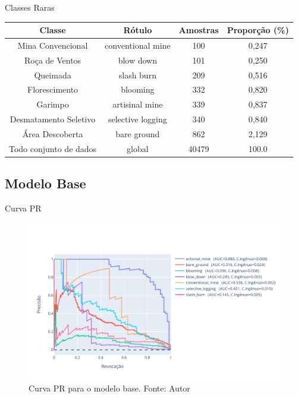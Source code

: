 \documentclass[8pt]{beamer}
\begin{document}
        
\begin{frame}{Classes Raras}
    \fontsize{7pt}{8pt}\selectfont
    \center
    \begin{tabular}{*{4}{c}}
        \hline
        Classe                  &            Rótulo &  Amostras      &  Proporção (\%) \\
        \hline
        Mina Convencional       & conventional mine &        100     &       0,247 \\
        Roça de Ventos          &         blow down &        101     &       0,250 \\
        Queimada                &        slash burn &        209     &       0,516 \\
        Florescimento           &          blooming &        332     &       0,820 \\
        Garimpo                 &    artisinal mine &        339     &       0,837 \\
        Desmatamento Seletivo   & selective logging &        340     &       0,840 \\
        Área Descoberta         &       bare ground &        862     &       2,129 \\
        Todo conjunto de dados  &            global &        40479   &       100.0 \\
        \hline
    \end{tabular}    
\end{frame}        
    
\subsection*{Modelo Base}
\begin{frame}{Curva PR}
\begin{figure}[!ht]
    \centering
    \includegraphics[width=\columnwidth]{Imagens/results/rsp-resnet-50_planet_pt/Curva PR para classes raras.pdf}
    \caption{ Curva PR para o modelo base. Fonte: Autor}
   \label{fig:CurvaPRResnet50}
\end{figure}     
\end{frame}
\end{document}
